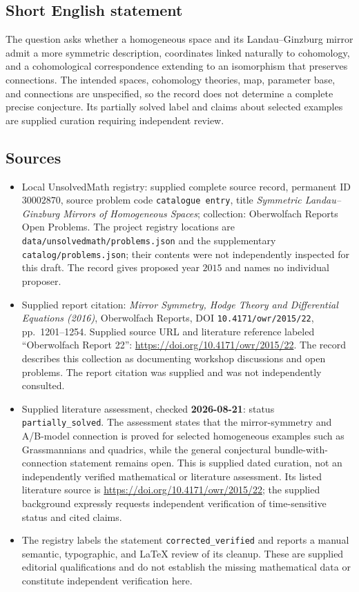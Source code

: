 \documentclass[11pt]{article}
\begin{document}
\subsection{Short English statement}
The question asks whether a homogeneous space and its Landau--Ginzburg mirror admit a more symmetric description, coordinates linked naturally to cohomology, and a cohomological correspondence extending to an isomorphism that preserves connections. The intended spaces, cohomology theories, map, parameter base, and connections are unspecified, so the record does not determine a complete precise conjecture. Its partially solved label and claims about selected examples are supplied curation requiring independent review.
\subsection{Sources}
\begin{itemize}
\item Local UnsolvedMath registry: supplied complete source record, permanent ID \(30002870\), source problem code \texttt{catalogue entry}, title \emph{Symmetric Landau--Ginzburg Mirrors of Homogeneous Spaces}; collection: Oberwolfach Reports Open Problems. The project registry locations are \texttt{data/unsolvedmath/problems.json} and the supplementary \texttt{catalog/problems.json}; their contents were not independently inspected for this draft. The record gives proposed year \(2015\) and names no individual proposer.
\item Supplied report citation: \emph{Mirror Symmetry, Hodge Theory and Differential Equations (2016)}, Oberwolfach Reports, DOI \texttt{10.4171/owr/2015/22}, pp.\ 1201--1254. Supplied source URL and literature reference labeled ``Oberwolfach Report 22'': \url{https://doi.org/10.4171/owr/2015/22}. The record describes this collection as documenting workshop discussions and open problems. The report citation was supplied and was not independently consulted.
\item Supplied literature assessment, checked \textbf{2026-08-21}: status \texttt{partially\_solved}. The assessment states that the mirror-symmetry and A/B-model connection is proved for selected homogeneous examples such as Grassmannians and quadrics, while the general conjectural bundle-with-connection statement remains open. This is supplied dated curation, not an independently verified mathematical or literature assessment. Its listed literature source is \url{https://doi.org/10.4171/owr/2015/22}; the supplied background expressly requests independent verification of time-sensitive status and cited claims.
\item The registry labels the statement \texttt{corrected\_verified} and reports a manual semantic, typographic, and LaTeX review of its cleanup. These are supplied editorial qualifications and do not establish the missing mathematical data or constitute independent verification here.
\end{itemize}
\end{document}
